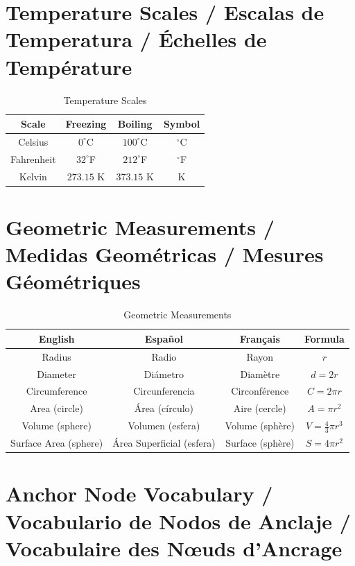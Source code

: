 \documentclass[12pt]{article}
\begin{document}
\section{Temperature Scales / Escalas de Temperatura / Échelles de Température}

\begin{table}[h]
\centering
\begin{tabular}{|c|c|c|c|}
\hline
\textbf{Scale} & \textbf{Freezing} & \textbf{Boiling} & \textbf{Symbol} \\
\hline
Celsius & $0^{\circ}$C & $100^{\circ}$C & $^{\circ}$C \\
\hline
Fahrenheit & $32^{\circ}$F & $212^{\circ}$F & $^{\circ}$F \\
\hline
Kelvin & $273.15$ K & $373.15$ K & K \\
\hline
\end{tabular}
\caption{Temperature Scales}
\end{table}

\section{Geometric Measurements / Medidas Geométricas / Mesures Géométriques}

\begin{table}[h]
\centering
\begin{tabular}{|c|c|c|c|}
\hline
\textbf{English} & \textbf{Español} & \textbf{Français} & \textbf{Formula} \\
\hline
Radius & Radio & Rayon & $r$ \\
\hline
Diameter & Diámetro & Diamètre & $d = 2r$ \\
\hline
Circumference & Circunferencia & Circonférence & $C = 2\pi r$ \\
\hline
Area (circle) & Área (círculo) & Aire (cercle) & $A = \pi r^2$ \\
\hline
Volume (sphere) & Volumen (esfera) & Volume (sphère) & $V = \frac{4}{3}\pi r^3$ \\
\hline
Surface Area (sphere) & Área Superficial (esfera) & Surface (sphère) & $S = 4\pi r^2$ \\
\hline
\end{tabular}
\caption{Geometric Measurements}
\end{table}

\section{Anchor Node Vocabulary / Vocabulario de Nodos de Anclaje / Vocabulaire des Nœuds d'Ancrage}
\end{document}
